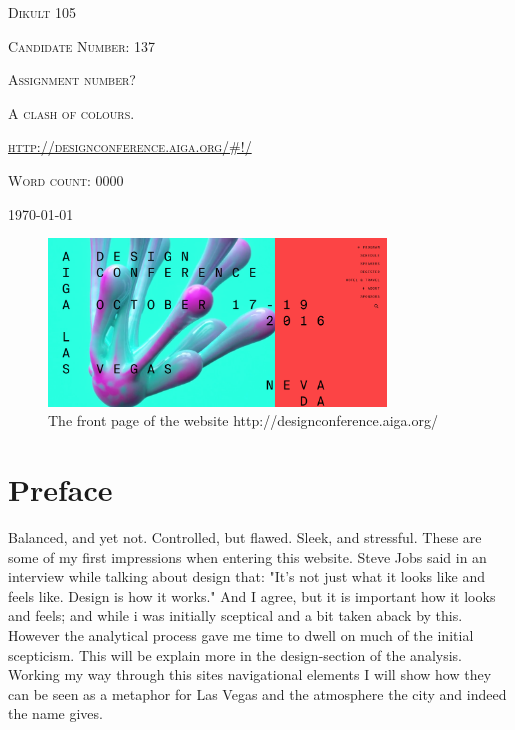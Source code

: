 \documentclass{article}
\begin{document}
	\begin{titlepage} 
		\centering
		{\scshape\Large Dikult 105\par}
		\vspace{2em}
		{\scshape\large Candidate Number: 137\par}
		\vspace{6em}
		{\scshape\Large Assignment number?\par}
		{\scshape\LARGE A clash of colours.\par}
		\vspace{1em}
		{\scshape\url{http://designconference.aiga.org/#!/}\par}
		\vfill
		{\scshape Word count: 0000\par}
		\vspace{3em}
		\large\today
	\end{titlepage}

	\begin{figure}[h!]
        \centering
        \includegraphics[width=0.8\textwidth]{frontPage}
        \caption{The front page of the website http://designconference.aiga.org/}
    \end{figure}
    \vspace{5em}
	\section{Preface}
	    Balanced, and yet not. Controlled, but flawed. Sleek, and stressful. These are some of my first impressions when entering this website. Steve Jobs said in an interview while talking about design that: "It's not just what it looks like and feels like. Design is how it works."\citep*{SteveJobsQuote} And I agree, but it is important how it looks and feels; and while i was initially sceptical and a bit taken aback by this. However the analytical process gave me time to dwell on much of the initial scepticism. This will be explain more in the design-section of the analysis. Working my way through this sites navigational elements I will show how they can be seen as a metaphor for Las Vegas and the atmosphere the city and indeed the name gives.
\end{document}

